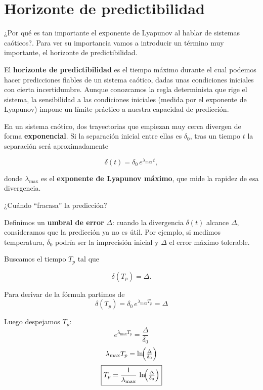 \documentclass[
  10pt,
  a4paper,
  DIV=11,
  numbers=noendperiod,
  open=any]{scrreprt}
\numberwithin{equation}{chapter}
\numberwithin{equation}{section}
\renewcommand{\[}{\begin{equation}}
\renewcommand{\]}{\end{equation}}
\begin{document}
\section{Horizonte de
predictibilidad}\label{horizonte-de-predictibilidad}

¿Por qué es tan importante el exponente de Lyapunov al hablar de
sistemas caóticos?. Para ver su importancia vamos a introducir un
término muy importante, el horizonte de predictibilidad.

El \textbf{horizonte de predictibilidad} es el tiempo máximo durante el
cual podemos hacer predicciones fiables de un sistema caótico, dadas
unas condiciones iniciales con cierta incertidumbre. Aunque conozcamos
la regla determinista que rige el sistema, la sensibilidad a las
condiciones iniciales (medida por el exponente de Lyapunov) impone un
límite práctico a nuestra capacidad de predicción.

En un sistema caótico, dos trayectorias que empiezan muy cerca divergen
de forma \textbf{exponencial}. Si la separación inicial entre ellas es
\(\delta_0\), tras un tiempo \(t\) la separación será aproximadamente

\begin{equation}
\delta(t) = \delta_0\,e^{\lambda_{\max}\,t},
\end{equation}

donde \(\lambda_{\max}\) es el \textbf{exponente de Lyapunov máximo},
que mide la rapidez de esa divergencia.

¿Cuándo ``fracasa'' la predicción?

Definimos un \textbf{umbral de error} \(\Delta\): cuando la divergencia
\(\delta(t)\) alcance \(\Delta\), consideramos que la predicción ya no
es útil. Por ejemplo, si medimos temperatura, \(\delta_0\) podría ser la
imprecisión inicial y \(\Delta\) el error máximo tolerable.

Buscamos el tiempo \(T_p\) tal que

\begin{equation}
\delta(T_p) = \Delta.
\end{equation}

Para derivar de la fórmula partimos de\\
\[
   \delta(T_p) = \delta_0\,e^{\lambda_{\max}T_p} = \Delta
   \]

Luego despejamos \(T_p\):\\
\[
   e^{\lambda_{\max}T_p} = \frac{\Delta}{\delta_0}
\]
\[
   \lambda_{\max}T_p = \ln\!\Bigl(\tfrac{\Delta}{\delta_0}\Bigr)
\]
\begin{equation}
   \boxed{T_p = \frac{1}{\lambda_{\max}}\,\ln\!\Bigl(\tfrac{\Delta}{\delta_0}\Bigr)}
   \label{eq:Tp}
\end{equation}
\end{document}
